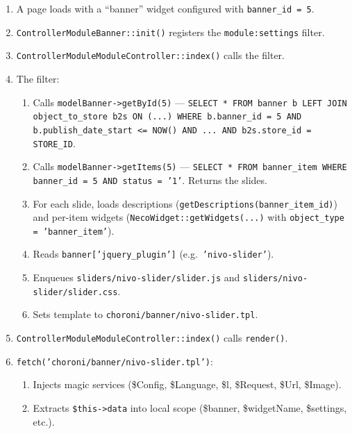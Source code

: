 \documentclass[11pt,a4paper]{article}
\begin{document}
\begin{enumerate}[leftmargin=1.6em,itemsep=2pt]
  \item A page loads with a ``banner'' widget configured with
        \texttt{banner\_id = 5}.
  \item \texttt{ControllerModuleBanner::init()} registers the
        \texttt{module:settings} filter.
  \item \texttt{ControllerModuleModuleController::index()} calls the
        filter.
  \item The filter:
        \begin{enumerate}[itemsep=2pt]
          \item Calls \texttt{modelBanner->getById(5)} ---
                \texttt{SELECT * FROM banner b LEFT JOIN
                object\_to\_store b2s ON (...) WHERE b.banner\_id = 5
                AND b.publish\_date\_start <= NOW() AND ... AND
                b2s.store\_id = STORE\_ID}.
          \item Calls \texttt{modelBanner->getItems(5)} ---
                \texttt{SELECT * FROM banner\_item WHERE banner\_id =
                5 AND status = '1'}. Returns the slides.
          \item For each slide, loads descriptions
                (\texttt{getDescriptions(banner\_item\_id)}) and
                per-item widgets
                (\texttt{NecoWidget::getWidgets(...)} with
                \texttt{object\_type = 'banner\_item'}).
          \item Reads \texttt{banner['jquery\_plugin']} (e.g.\
                \texttt{'nivo-slider'}).
          \item Enqueues \texttt{sliders/nivo-slider/slider.js} and
                \texttt{sliders/nivo-slider/slider.css}.
          \item Sets template to
                \texttt{choroni/banner/nivo-slider.tpl}.
        \end{enumerate}
  \item \texttt{ControllerModuleModuleController::index()} calls
        \texttt{render()}.
  \item \texttt{fetch('choroni/banner/nivo-slider.tpl')}:
        \begin{enumerate}[itemsep=2pt]
          \item Injects magic services (\$Config, \$Language, \$l,
                \$Request, \$Url, \$Image).
          \item Extracts \texttt{\$this->data} into local scope
                (\$banner, \$widgetName, \$settings, etc.).

\end{enumerate}
\end{enumerate}
\end{document}
